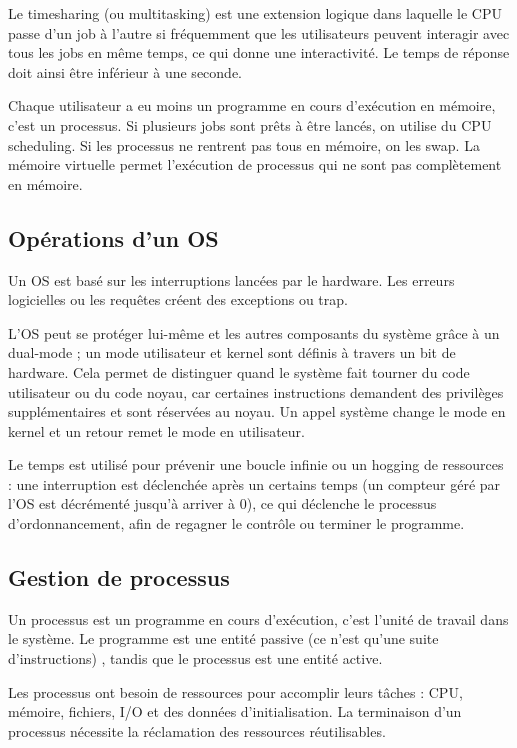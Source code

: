 	Le timesharing (ou multitasking) est une extension logique dans laquelle le CPU passe d'un job à l'autre si fréquemment que les utilisateurs peuvent interagir avec tous les jobs en même temps, ce qui donne une interactivité. Le temps de réponse doit ainsi être inférieur à une seconde.
	
	Chaque utilisateur a eu moins un programme en cours d'exécution en mémoire, c'est un processus. Si plusieurs jobs sont prêts à être lancés, on utilise du CPU scheduling. Si les processus ne rentrent pas tous en mémoire, on les swap. La mémoire virtuelle permet l'exécution de processus qui ne sont pas complètement en mémoire.
	
		\subsection{Opérations d'un OS}
		
		Un OS est basé sur les interruptions lancées par le hardware. Les erreurs logicielles ou les requêtes créent des exceptions ou trap.
		
		L'OS peut se protéger lui-même et les autres composants du système grâce à un dual-mode ; un mode utilisateur et kernel sont définis à travers un bit de hardware. Cela permet de distinguer quand le système fait tourner du code utilisateur ou du code noyau, car certaines instructions demandent des privilèges supplémentaires et sont réservées au noyau. Un appel système change le mode en kernel et un retour remet le mode en utilisateur.
		
		
		Le temps est utilisé pour prévenir une boucle infinie ou un hogging de ressources : une interruption est déclenchée après un certains temps (un compteur géré par l'OS est décrémenté jusqu'à arriver à 0), ce qui déclenche le processus d'ordonnancement, afin de regagner le contrôle ou terminer le programme.
		
		\subsection{Gestion de processus}
		
		Un processus est un programme en cours d'exécution, c'est l'unité de travail dans le système. Le programme est une entité passive (ce n'est qu'une suite d'instructions) , tandis que le processus est une entité active.
		
		Les processus ont besoin de ressources pour accomplir leurs tâches : CPU, mémoire, fichiers, I/O et des données d'initialisation. La terminaison d'un processus nécessite la réclamation des ressources réutilisables.
		
